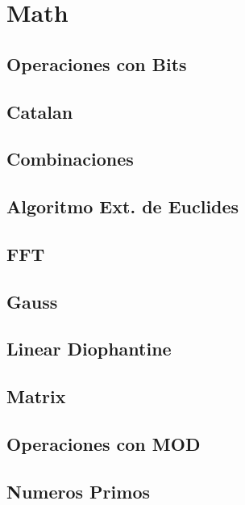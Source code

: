 \section{Math}
\subsection{Operaciones con Bits}
\raggedbottom
\hrulefill
\subsection{Catalan}
\raggedbottom
\hrulefill
\subsection{Combinaciones}
\raggedbottom
\hrulefill
\subsection{Algoritmo Ext. de Euclides}
\raggedbottom
\hrulefill
\subsection{FFT}
\raggedbottom
\hrulefill
\subsection{Gauss}
\raggedbottom
\hrulefill
\subsection{Linear Diophantine}
\raggedbottom
\hrulefill
\subsection{Matrix}
\raggedbottom
\hrulefill
\subsection{Operaciones con MOD}
\raggedbottom
\hrulefill
\subsection{Numeros Primos}
\raggedbottom
\hrulefill
